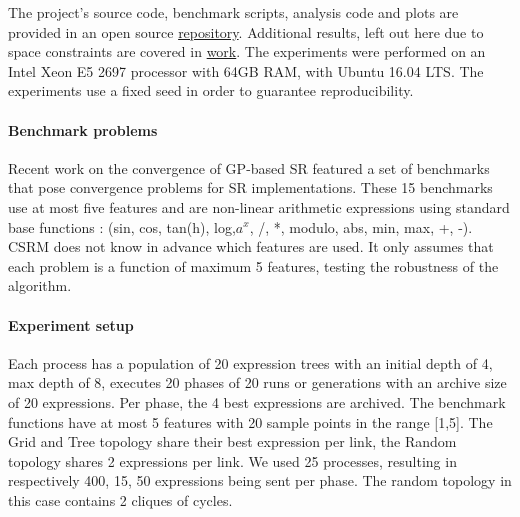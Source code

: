
The project's source code, benchmark scripts, analysis code and plots are provided in an open source  \href{https://bitbucket.org/bcardoen/csrm}{repository}. Additional results, left out here due to space constraints are covered in \href{https://bitbucket.org/bcardoen/csrm/src/9de4b990ce27bbaeb885203f82a76635d8d92473/thesis/thesis/MsCThesisBenCardoen.pdf?at=master&fileviewer=file-view-default}{work}.
The experiments were performed on an Intel Xeon E5 2697 processor with 64GB RAM, with Ubuntu 16.04 LTS.  The experiments use a fixed seed in order to guarantee reproducibility. 
 
\paragraph{Benchmark problems}
Recent work on the convergence of GP-based SR \cite{SRAccur, SRBaseline} featured a set of benchmarks that pose convergence problems for SR implementations. 
These 15 benchmarks use at most five features and are non-linear arithmetic expressions using standard base functions : (sin, cos, tan(h), log,$a^x$, /, *, modulo, abs, min, max, +, -). CSRM does not know in advance which features are used. It only assumes that each problem is a function of maximum 5 features, testing the robustness of the algorithm.

\paragraph{Experiment setup}
Each process has a population of 20 expression trees with an initial depth of 4, max depth of 8, executes 20 phases of 20 runs or generations with an archive size of 20 expressions. Per phase, the 4 best expressions are archived. The benchmark functions have at most 5 features with 20 sample points in the range [1,5]. The Grid and Tree topology share their best expression per link, the Random topology shares 2 expressions per link. We used 25 processes, resulting in respectively 400, 15, 50 expressions being sent per phase. The random topology in this case contains 2 cliques of cycles.

